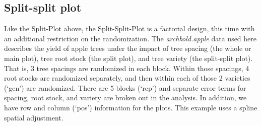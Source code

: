 \documentclass[
]{book}
\newenvironment{Shaded}{\begin{snugshade}}{\end{snugshade}}
\newcommand{\NormalTok}[1]{#1}
\begin{document}
\begin{Shaded}
\end{Shaded}

\hypertarget{split-split-plot-1}{%
\subsection{Split-split plot}\label{split-split-plot-1}}

Like the Split-Plot above, the Split-Split-Plot is a factorial design, this time with an additional restriction on the randomization. The \emph{archbold.apple} data used here describes the yield of apple trees under the impact of tree spacing (the whole or main plot), tree root stock (the split plot), and tree variety (the split-split plot). That is, 3 tree spacings are randomized in each block. Within those spacings, 4 root stocks are randomized separately, and then within each of those 2 varieties (`gen') are randomized. There are 5 blocks (`rep') and separate error terms for spacing, root stock, and variety are broken out in the analysis. In addition, we have row and column (`pos') information for the plots. This example uses a spline spatial adjustment.
\end{document}
